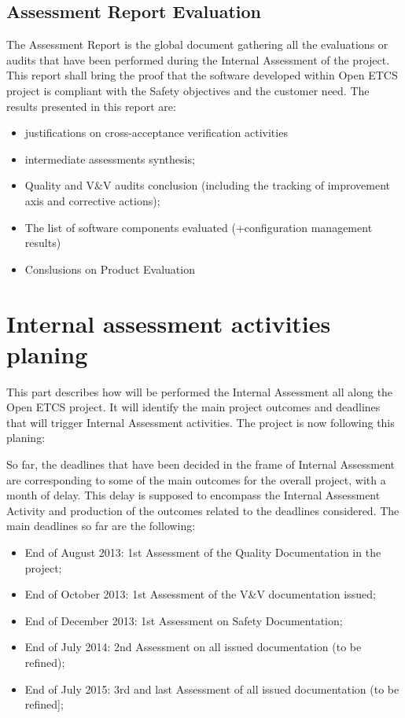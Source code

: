 \documentclass{template/openetcs_article}
\begin{document}
\subsection{Assessment Report Evaluation}
The Assessment Report is the global document gathering all the evaluations or audits that have been performed during the Internal Assessment of the project.
This report shall bring the proof that the software developed within Open ETCS project is compliant with the Safety objectives and the customer need.
The results presented in this report are:
 \begin{itemize}
\item justifications on cross-acceptance verification activities
\item intermediate assessments synthesis;
\item Quality and V\&V audits conclusion (including the tracking of improvement axis and corrective actions);
\item The list of software components evaluated (+configuration management results)
\item Conslusions on Product Evaluation
\end{itemize}

\section{Internal assessment activities planing}
This part describes how will be performed the Internal Assessment all along the Open ETCS project. It will identify the main project outcomes and deadlines that will trigger Internal Assessment activities.
The project is now following this planing:


So far, the deadlines that have been decided in the frame of Internal Assessment are corresponding to some of the main outcomes for the overall project, with a month of delay. This delay is supposed to encompass the Internal Assessment Activity and production of the outcomes related to the deadlines considered. The main deadlines so far are the following:
\begin{itemize}
\item End of August 2013: 1st Assessment of the Quality Documentation in the project;
\item End of October 2013: 1st Assessment of the V\&V documentation issued;
\item End of December 2013: 1st Assessment on Safety Documentation;
\item End of July 2014: 2nd Assessment on all issued documentation (to be refined);
\item End of July 2015: 3rd and last Assessment of all issued documentation (to be refined];
\end{itemize}
\end{document}

